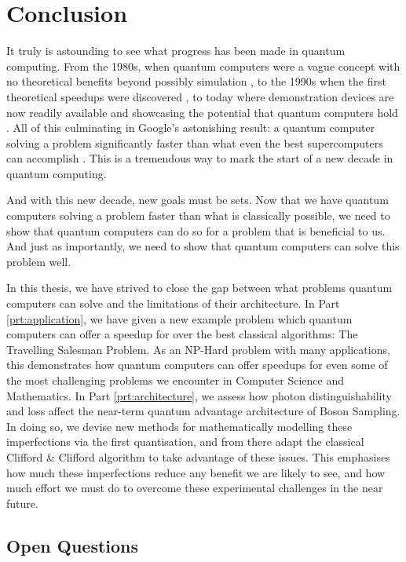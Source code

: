 \chapter{Conclusion}
\label{chp:conclusion}

It truly is astounding to see what progress has been made in quantum computing. From the 1980s, when quantum computers were a vague concept with no theoretical benefits beyond possibly simulation \cite{feynman1982}, to the 1990s when the first theoretical speedups were discovered \cite{shor1994, grover96}, to today where demonstration devices are now readily available and showcasing the potential that quantum computers hold \cite{rigetti, ibm}. All of this culminating in Google's astonishing result: a quantum computer solving a problem significantly faster than what even the best supercomputers can accomplish \cite{arute2019}. This is a tremendous way to mark the start of a new decade in quantum computing.

And with this new decade, new goals must be sets. Now that we have quantum computers solving a problem faster than what is classically possible, we need to show that quantum computers can do so for a problem that is beneficial to us. And just as importantly, we need to show that quantum computers can solve this problem well.

In this thesis, we have strived to close the gap between what problems quantum computers can solve and the limitations of their architecture. In Part \ref{prt:application}, we have given a new example problem which quantum computers can offer a speedup for over the best classical algorithms: The Travelling Salesman Problem. As an NP-Hard problem with many applications, this demonstrates how quantum computers can offer speedups for even some of the most challenging problems we encounter in Computer Science and Mathematics. In Part \ref{prt:architecture}, we assess how photon distinguishability and loss affect the near-term quantum advantage architecture of Boson Sampling. In doing so, we devise new methods for mathematically modelling these imperfections via the first quantisation, and from there adapt the classical Clifford \& Clifford algorithm \cite{clifford2017} to take advantage of these issues. This emphasises how much these imperfections reduce any benefit we are likely to see, and how much effort we must do to overcome these experimental challenges in the near future.

\section{Open Questions}
\label{sec:oq}

